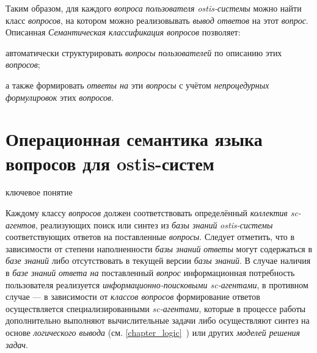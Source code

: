 Таким образом, для каждого \textit{вопроса} \textit{пользователя ostis-системы} можно найти класс \textit{вопросов}, на котором можно реализовывать \textit{вывод ответов} на этот \textit{вопрос}. Описанная \textit{Семантическая классификация вопросов} позволяет:
\begin{textitemize}
	\item автоматически структурировать \textit{вопросы} \textit{пользователей} по описанию этих \textit{вопросов};
	\item а также формировать \textit{ответы на} эти \textit{вопросы} с учётом \textit{непроцедурных формулировок} этих \textit{вопросов}.
\end{textitemize}

\section{Операционная семантика языка вопросов для ostis-систем}
\label{sec_requests_op_semantics}

\begin{SCn}
\begin{scnrelfromlist}{ключевое понятие}
\end{scnrelfromlist}
\end{SCn}

Каждому классу \textit{вопросов} должен соответствовать определённый \textit{коллектив sc-агентов}, реализующих поиск или синтез из \textit{базы знаний} \textit{ostis-системы} соответствующих ответов на поставленные \textit{вопросы}. Следует отметить, что в зависимости от степени наполненности \textit{базы знаний} \textit{ответы} могут содержаться в \textit{базе знаний} либо отсутствовать в текущей версии \textit{базы знаний}. В случае наличия в \textit{базе знаний} \textit{ответа на} поставленный \textit{вопрос} информационная потребность пользователя реализуется \textit{информационно-поисковыми sc-агентами}, в противном случае --- в зависимости от \textit{классов вопросов} формирование ответов осуществляется специализированными \textit{sc-агентами}, которые в процессе работы дополнительно выполняют вычислительные задачи либо осуществляют синтез на основе \textit{логического вывода} (см. \ref{chapter_logic}~) или других \textit{моделей решения задач}. 

